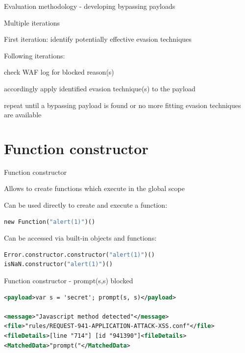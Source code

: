 \documentclass[aspectratio=169]{beamer}
\begin{document}
\begin{frame}[fragile]{Evaluation methodology - developing bypassing payloads}
	\begin{vfilleditems}
		\item<2-> Multiple iterations
		\item<3-> First iteration: identify potentially effective evasion techniques
		\item<4-> Following iterations:
		\begin{vfilleditems}
			\item<5-> check WAF log for blocked reason(s)
			\item<6-> accordingly apply identified evasion technique(s) to the payload
			\item<7-> repeat until a bypassing payload is found or no more fitting evasion techniques are available
		\end{vfilleditems}
	\end{vfilleditems}
\end{frame}

\section{Function constructor}
\begin{frame}[fragile]{Function constructor}
	\begin{vfilleditems}
		\item<2-> Allows to create functions which execute in the global scope
		\item<3-> Can be used directly to create and execute a function:
		\begin{lstlisting}[style=basicStyle, language=Python]
new Function("alert(1)")()
\end{lstlisting}
		\item<4-> Can be accessed via built-in objects and functions:
		\begin{lstlisting}[style=basicStyle, language=Python]
Error.constructor.constructor("alert(1)")()
isNaN.constructor("alert(1)")()
\end{lstlisting}
	\end{vfilleditems}
\end{frame}

\begin{frame}[fragile]{Function constructor - prompt(s,s) blocked}
	\begin{lstlisting}[style=ruleStyle, language=XML]
<payload>var s = 'secret'; prompt(s, s)</payload>

<message>"Javascript method detected"</message>
<file>"rules/REQUEST-941-APPLICATION-ATTACK-XSS.conf"</file>
<fileDetails>[line "714"] [id "941390"]<fileDetails>
<MatchedData>"prompt("</MatchedData>
\end{lstlisting}
\end{frame}
\end{document}
